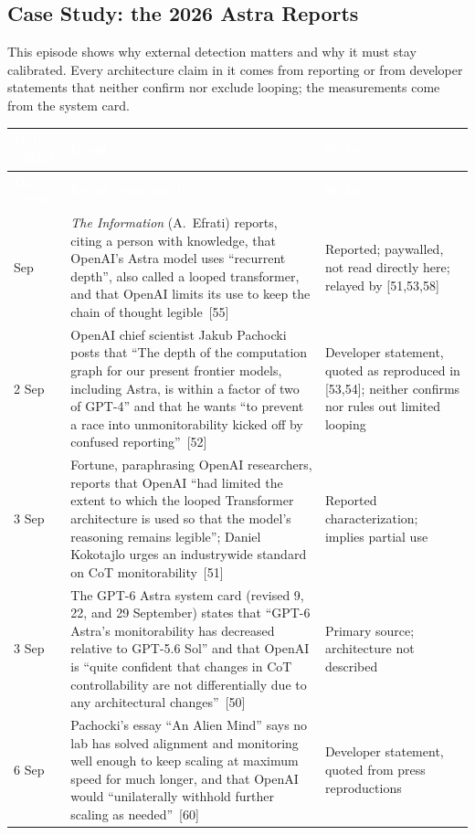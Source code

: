 \documentclass[11pt,letterpaper]{article}
\newcommand{\hd}[1]{\textcolor{white}{\bfseries #1}}
\newcommand{\tablefinish}{\arrayrulecolor{deepindigo}\specialrule{0.8pt}{0pt}{0pt}\arrayrulecolor{black}}
\newcommand{\zebra}{\rowcolors{2}{white}{paleindigo!75}}
\begin{document}
\subsection{Case Study: the 2026 Astra Reports}
\label{sec:astra}

This episode shows why external detection matters and why it must stay calibrated. Every architecture claim in it comes from reporting or from developer statements that neither confirm nor exclude looping; the measurements come from the system card.

{\footnotesize
\zebra
\begin{longtable}{L{1.45cm} L{10.6cm} L{3.9cm}}
\hd{Date (2026)} & \hd{Event} & \hd{Status} \\
\endfirsthead
{}
\hd{Date (2026)} & \hd{Event (continued)} & \hd{Status} \\
\endhead
\tablefinish
{} Sep & \emph{The Information} (A.~Efrati) reports, citing a person with knowledge, that OpenAI's Astra model uses ``recurrent depth'', also called a looped transformer, and that OpenAI limits its use to keep the chain of thought legible~[55] & Reported; paywalled, not read directly here; relayed by [51,53,58] \\
2 Sep & OpenAI chief scientist Jakub Pachocki posts that ``The depth of the computation graph for our present frontier models, including Astra, is within a factor of two of GPT-4'' and that he wants ``to prevent a race into unmonitorability kicked off by confused reporting''~[52] & Developer statement, quoted as reproduced in [53,54]; neither confirms nor rules out limited looping \\
3 Sep & Fortune, paraphrasing OpenAI researchers, reports that OpenAI ``had limited the extent to which the looped Transformer architecture is used so that the model's reasoning remains legible''; Daniel Kokotajlo urges an industrywide standard on CoT monitorability~[51] & Reported characterization; implies partial use \\
3 Sep & The GPT-6 Astra system card (revised 9, 22, and 29 September) states that ``GPT-6 Astra's monitorability has decreased relative to GPT-5.6 Sol'' and that OpenAI is ``quite confident that changes in CoT controllability are not differentially due to any architectural changes''~[50] & Primary source; architecture not described \\
6 Sep & Pachocki's essay ``An Alien Mind'' says no lab has solved alignment and monitoring well enough to keep scaling at maximum speed for much longer, and that OpenAI would ``unilaterally withhold further scaling as needed''~[60] & Developer statement, quoted from press reproductions \\

\end{longtable}}
\end{document}
